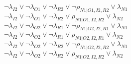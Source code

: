 $\neg\lambda_{I2} \vee \neg\lambda_{O1} \vee \neg\lambda_{R2} \vee \neg\rho_{N1|O1,I2,R2} \vee \lambda_{N1}$\\
$\neg\lambda_{I2} \vee \neg\lambda_{O1} \vee \neg\lambda_{R2} \vee \rho_{N1|O1,I2,R2} \vee \lambda_{N2}$\\
$\neg\lambda_{I2} \vee \neg\lambda_{O2} \vee \neg\lambda_{R1} \vee \neg\rho_{N1|O2,I2,R1} \vee \lambda_{N1}$\\
$\neg\lambda_{I2} \vee \neg\lambda_{O2} \vee \neg\lambda_{R1} \vee \rho_{N1|O2,I2,R1} \vee \lambda_{N2}$\\
$\neg\lambda_{I2} \vee \neg\lambda_{O2} \vee \neg\lambda_{R2} \vee \neg\rho_{N1|O2,I2,R2} \vee \lambda_{N1}$\\
$\neg\lambda_{I2} \vee \neg\lambda_{O2} \vee \neg\lambda_{R2} \vee \rho_{N1|O2,I2,R2} \vee \lambda_{N2}$\\
